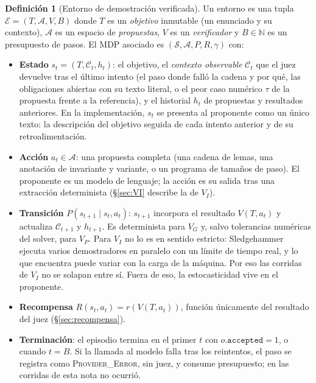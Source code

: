 \documentclass[11pt,a4paper]{article}
\theoremstyle{definition}
\newtheorem{definition}{Definición}
\theoremstyle{remark}
\newcommand{\lab}[1]{\textsc{#1}}
\begin{document}
\begin{definition}[Entorno de demostración verificada]
Un entorno es una tupla $\mathcal{E} = (T, \mathcal{A}, V, B)$ donde $T$ es un \emph{objetivo} inmutable (un enunciado y su contexto), $\mathcal{A}$ es un espacio de \emph{propuestas}, $V$ es un \emph{verificador} y $B \in \mathbb{N}$ es un presupuesto de pasos. El MDP asociado es $(\mathcal{S}, \mathcal{A}, P, R, \gamma)$ con:
\begin{itemize}
  \item \textbf{Estado} $s_t = (T, \mathcal{C}_t, h_t)$: el objetivo, el \emph{contexto observable} $\mathcal{C}_t$ que el juez devuelve tras el último intento (el paso donde falló la cadena y por qué, las obligaciones abiertas con su texto literal, o el peor caso numérico $\tau$ de la propuesta frente a la referencia), y el historial $h_t$ de propuestas y resultados anteriores. En la implementación, $s_t$ se presenta al proponente como un único texto: la descripción del objetivo seguida de cada intento anterior y de su retroalimentación.
  \item \textbf{Acción} $a_t \in \mathcal{A}$: una propuesta completa (una cadena de lemas, una anotación de invariante y variante, o un programa de tamaños de paso). El proponente es un modelo de lenguaje; la acción es su salida tras una extracción determinista (§\ref{sec:VI} describe la de $V_I$).
  \item \textbf{Transición} $P(s_{t+1} \mid s_t, a_t)$: $s_{t+1}$ incorpora el resultado $V(T, a_t)$ y actualiza $\mathcal{C}_{t+1}$ y $h_{t+1}$. Es determinista para $V_G$ y, salvo tolerancias numéricas del solver, para $V_P$. Para $V_I$ no lo es en sentido estricto: Sledgehammer ejecuta varios demostradores en paralelo con un límite de tiempo real, y lo que encuentra puede variar con la carga de la máquina. Por eso las corridas de $V_I$ no se solapan entre sí. Fuera de eso, la estocasticidad vive en el proponente.
  \item \textbf{Recompensa} $R(s_t, a_t) = r(V(T, a_t))$, función únicamente del resultado del juez (§\ref{sec:recompensa}).
  \item \textbf{Terminación}: el episodio termina en el primer $t$ con $o.\texttt{accepted} = 1$, o cuando $t = B$. Si la llamada al modelo falla tras los reintentos, el paso se registra como \lab{Provider\_Error}, sin juez, y consume presupuesto; en las corridas de esta nota no ocurrió.
\end{itemize}
\end{definition}
\end{document}
